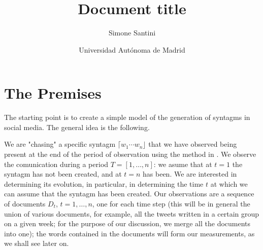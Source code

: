 \documentclass[10pt]{article}
\newcommand{\dqt}[1]        {"{#1}"}
\newcommand{\synt}[1]     {\lceil{#1}\rfloor}
\begin{document}
\title{Document title}
\author{Simone Santini}
\date{Universidad Aut\'onoma de Madrid}

\section{The Premises}
The starting point is to create a simple model of the generation of
syntagms in social media. The general idea is the following.

We are \dqt{chasing} a specific syntagm $\synt{w_1\cdots{w_n}}$ that
we have observed being present at the end of the period of observation
using the method in \cite{shang:2018}. We observe the comunication during a
period $T=[1,\ldots,n]$: we asume that at $t=1$ the syntagm has not
been created, and at $t=n$ has been. We are interested in determining
its evolution, in particular, in determining the time $t$ at which we
can assume that the syntagm has been created. Our observations are a
sequence of documents $D_t$, $t=1,\ldots,n$, one for each time step
(this will be in general the union of various documents, for example,
all the tweets written in a certain group on a given week; for the
purpose of our discussion, we merge all the documents into one); the
words contained in the documents will form our measurements, as we
shall see later on.
\end{document}
